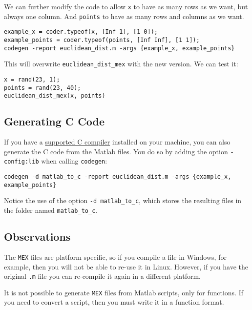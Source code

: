\documentclass[12pt, a4paper]{article}
\begin{document}
We can further modify the code to allow \texttt{x} to have as many rows as we want, but always one column.
And \texttt{points} to have as many rows and columns as we want.
\lstset{language=matlab,label= ,caption= ,captionpos=b,firstnumber=1,numbers=left,style=Matlab-editor}
\begin{lstlisting}
example_x = coder.typeof(x, [Inf 1], [1 0]);
example_points = coder.typeof(points, [Inf Inf], [1 1]);
codegen -report euclidean_dist.m -args {example_x, example_points}
\end{lstlisting}

This will overwrite \texttt{euclidean\_dist\_mex} with the new version.
We can test it:
\lstset{language=matlab,label= ,caption= ,captionpos=b,firstnumber=1,numbers=left,style=Matlab-editor}
\begin{lstlisting}
x = rand(23, 1);
points = rand(23, 40);
euclidean_dist_mex(x, points)
\end{lstlisting}
\subsection{Generating C Code}
\label{sec:org2534229}
If you have a \href{https://www.mathworks.com/support/requirements/supported-compilers.html}{supported C compiler} installed on your machine, you can also generate the C code from the Matlab files.
You do so by adding the option \texttt{-config:lib} when calling \texttt{codegen}:
\lstset{language=matlab,label= ,caption= ,captionpos=b,firstnumber=1,numbers=left,style=Matlab-editor}
\begin{lstlisting}
codegen -d matlab_to_c -report euclidean_dist.m -args {example_x, example_points}
\end{lstlisting}
Notice the use of the option \texttt{-d matlab\_to\_c}, which stores the resulting files in the folder named \texttt{matlab\_to\_c}.
\subsection{Observations}
\label{sec:org835a41e}
The \texttt{MEX} files are platform specific, so if you compile a file in Windows, for example, then you will not be able to re-use it in Linux.
However, if you have the original \texttt{.m} file you can re-compile it again in a different platform.

It is not possible to generate \texttt{MEX} files from Matlab scripts, only for functions.
If you need to convert a script, then you must write it in a function format.
\end{document}
